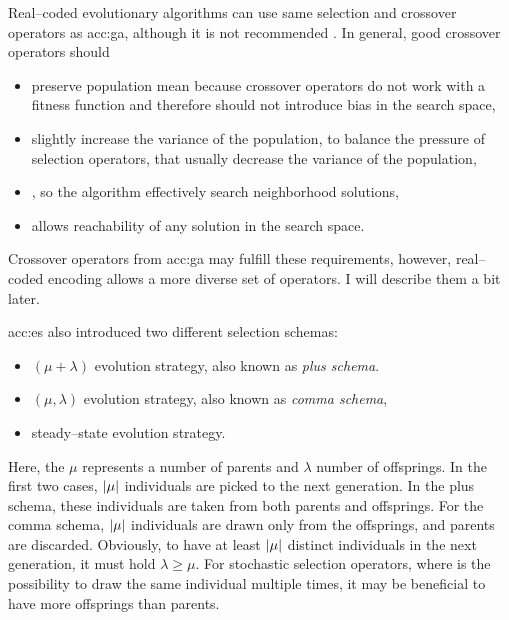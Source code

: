 Real--coded evolutionary algorithms can use same selection and crossover operators as \acrshort{acc:ga}, although it is not recommended \citet{IntroductionToEA}. In general, good crossover operators should
\begin{itemize}
    \item preserve population mean because crossover operators do not work with a fitness function and therefore should not introduce bias in the search space,
    \item slightly increase the variance of the population, to balance the pressure of selection operators, that usually decrease the variance of the population,
    \item\label{enum:espopulationvariance} \snipescondition, so the algorithm effectively search neighborhood solutions,
    \item allows reachability of any solution in the search space.
\end{itemize}
Crossover operators from \acrshort{acc:ga} may fulfill these requirements, however, real--coded encoding allows a more diverse set of operators. I will describe them a bit later.

\acrshort{acc:es} also introduced two different selection schemas:
\begin{itemize}
    \item $\left(\mu+\lambda\right)$ evolution strategy, also known as \emph{plus schema}.
    \item  $\left(\mu,\lambda\right)$ evolution strategy, also known as \emph{comma schema},
    \item\label{enum:steadystate} steady--state evolution strategy.
\end{itemize}
Here, the $\mu$ represents a number of parents and $\lambda$ number of offsprings. In the first two cases, $\left|{\mu}\right|$ individuals are picked to the next generation. In the plus schema, these individuals are taken from both parents and offsprings. For the comma schema, $\left|{\mu}\right|$ individuals are drawn only from the offsprings, and parents are discarded. Obviously, to have at least $\left|{\mu}\right|$ distinct individuals in the next generation, it must hold $\lambda\geq\mu$. For stochastic selection operators, where is the possibility to draw the same individual multiple times, it may be beneficial to have more offsprings than parents.


